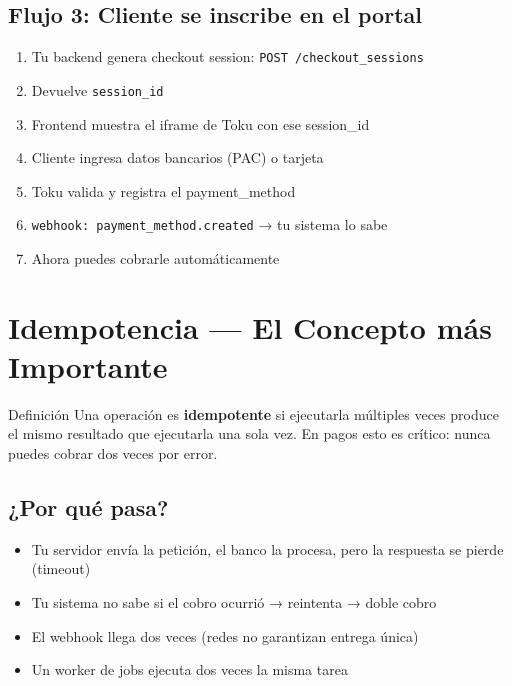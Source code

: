 \documentclass[11pt,a4paper]{article}
\begin{document}
\subsection{Flujo 3: Cliente se inscribe en el portal}

\begin{tcolorbox}[colback=tipgreen!5,colframe=tipgreen]
\begin{enumerate}
  \item Tu backend genera checkout session: \texttt{POST /checkout\_sessions}
  \item Devuelve \texttt{session\_id}
  \item Frontend muestra el iframe de Toku con ese session\_id
  \item Cliente ingresa datos bancarios (PAC) o tarjeta
  \item Toku valida y registra el payment\_method
  \item \texttt{webhook: payment\_method.created} → tu sistema lo sabe
  \item Ahora puedes cobrarle automáticamente
\end{enumerate}
\end{tcolorbox}

\section{Idempotencia — El Concepto más Importante}

\begin{dominiobox}{Definición}
Una operación es \textbf{idempotente} si ejecutarla múltiples veces produce el mismo resultado
que ejecutarla una sola vez. En pagos esto es crítico: nunca puedes cobrar dos veces por error.
\end{dominiobox}

\subsection{¿Por qué pasa?}

\begin{itemize}
  \item Tu servidor envía la petición, el banco la procesa, pero la respuesta se pierde (timeout)
  \item Tu sistema no sabe si el cobro ocurrió → reintenta → doble cobro
  \item El webhook llega dos veces (redes no garantizan entrega única)
  \item Un worker de jobs ejecuta dos veces la misma tarea
\end{itemize}
\end{document}

